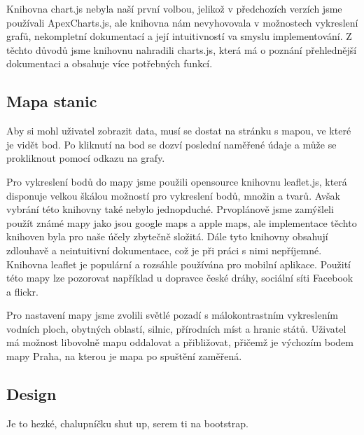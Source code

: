Knihovna chart.js nebyla naší první volbou, jelikož v předchozích verzích jsme používali ApexCharts.js, ale knihovna nám nevyhovovala v možnostech vykreslení grafů, nekompletní dokumentací a její intuitivností va smyslu implementování.
Z těchto důvodů jsme knihovnu nahradili charts.js, která má o poznání přehlednější dokumentaci a obsahuje více potřebných funkcí.

\subsection{Mapa stanic}
Aby si mohl uživatel zobrazit data, musí se dostat na stránku s mapou, ve které je vidět bod. Po kliknutí na bod se dozví poslední naměřené údaje a může se prokliknout pomocí odkazu na grafy.

Pro vykreslení bodů do mapy jsme použili opensource knihovnu leaflet.js, která disponuje velkou škálou možností pro vykreslení bodů, množin a tvarů.
Avšak vybrání této knihovny také nebylo jednopduché. Prvoplánově jsme zamýšleli použít známé mapy jako jsou google maps a apple maps, ale implementace těchto knihoven byla pro naše účely zbytečně složitá. Dále tyto knihovny obsahují zdlouhavě a neintuitivní dokumentace, což je při práci s nimi nepříjemné.
Knihovna leaflet je populární a rozsáhle používána pro mobilní aplikace. Použití této mapy lze pozorovat například u dopravce české dráhy, sociální síti Facebook a flickr.

Pro nastavení mapy jsme zvolili světlé pozadí s málokontrastním vykreslením vodních ploch, obytných oblastí, silnic, přírodních míst a hranic států. Uživatel má možnost libovolně mapu oddalovat a přibližovat, přičemž je výchozím bodem mapy Praha, na kterou je mapa po spuštění zaměřená.

\subsection{Design}
Je to hezké, chalupníčku shut up, serem ti na bootstrap.